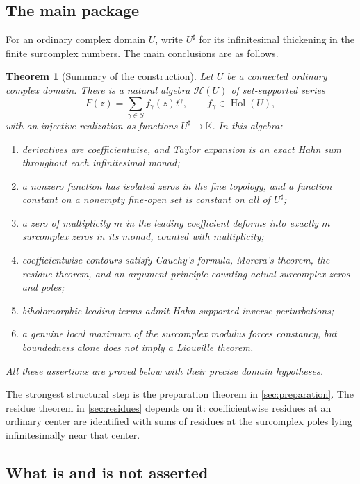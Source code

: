 \documentclass[11pt,letterpaper]{article}
\numberwithin{equation}{section}
\newtheorem{theorem}{Theorem}[section]
\theoremstyle{definition}
\theoremstyle{remark}
\newcommand{\K}{\mathbb{K}}
\newcommand{\HH}{\mathcal{H}}
\newcommand{\Hol}{\operatorname{Hol}}
\begin{document}
\subsection{The main package}

For an ordinary complex domain $U$, write $U^\sharp$ for its infinitesimal
thickening in the finite surcomplex numbers. The main conclusions are as
follows.

\begin{theorem}[Summary of the construction]\label{thm:summary}
Let $U$ be a connected ordinary complex domain. There is a natural algebra
$\HH(U)$ of set-supported series
\[
 F(z)=\sum_{\gamma\in S} f_\gamma(z)t^\gamma,
 \qquad f_\gamma\in\Hol(U),
\]
with an injective realization as functions $U^\sharp\to\K$. In this algebra:
\begin{enumerate}[label=(\roman*)]
\item derivatives are coefficientwise, and Taylor expansion is an exact Hahn
sum throughout each infinitesimal monad;
\item a nonzero function has isolated zeros in the fine topology, and a
function constant on a nonempty fine-open set is constant on all of
$U^\sharp$;
\item a zero of multiplicity $m$ in the leading coefficient deforms into
exactly $m$ surcomplex zeros in its monad, counted with multiplicity;
\item coefficientwise contours satisfy Cauchy's formula, Morera's theorem,
the residue theorem, and an argument principle counting actual surcomplex
zeros and poles;
\item biholomorphic leading terms admit Hahn-supported inverse perturbations;
\item a genuine local maximum of the surcomplex modulus forces constancy,
but boundedness alone does not imply a Liouville theorem.
\end{enumerate}
All these assertions are proved below with their precise domain hypotheses.
\end{theorem}

The strongest structural step is the preparation theorem in
\cref{sec:preparation}. The residue theorem in \cref{sec:residues} depends on
it: coefficientwise residues at an ordinary center are identified with sums
of residues at the surcomplex poles lying infinitesimally near that center.

\subsection{What is and is not asserted}
\end{document}
